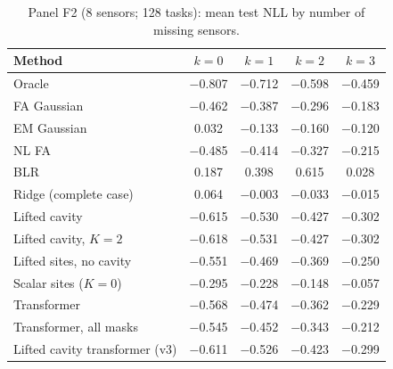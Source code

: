 \begin{table}[t]
\centering\small
\caption{\label{tab:moreF2}Panel F2 (8 sensors; 128 tasks): mean test NLL by number of missing sensors.}
\begin{tabular}{lcccc}
\toprule
Method & $k{=}0$ & $k{=}1$ & $k{=}2$ & $k{=}3$\\
\midrule
Oracle & $-$0.807 & $-$0.712 & $-$0.598 & $-$0.459\\
FA Gaussian & $-$0.462 & $-$0.387 & $-$0.296 & $-$0.183\\
EM Gaussian & 0.032 & $-$0.133 & $-$0.160 & $-$0.120\\
NL FA & $-$0.485 & $-$0.414 & $-$0.327 & $-$0.215\\
BLR & 0.187 & 0.398 & 0.615 & 0.028\\
Ridge (complete case) & 0.064 & $-$0.003 & $-$0.033 & $-$0.015\\
Lifted cavity & $-$0.615 & $-$0.530 & $-$0.427 & $-$0.302\\
Lifted cavity, $K=2$ & $-$0.618 & $-$0.531 & $-$0.427 & $-$0.302\\
Lifted sites, no cavity & $-$0.551 & $-$0.469 & $-$0.369 & $-$0.250\\
Scalar sites ($K=0$) & $-$0.295 & $-$0.228 & $-$0.148 & $-$0.057\\
Transformer & $-$0.568 & $-$0.474 & $-$0.362 & $-$0.229\\
Transformer, all masks & $-$0.545 & $-$0.452 & $-$0.343 & $-$0.212\\
Lifted cavity transformer (v3) & $-$0.611 & $-$0.526 & $-$0.423 & $-$0.299\\
\bottomrule
\end{tabular}
\end{table}

